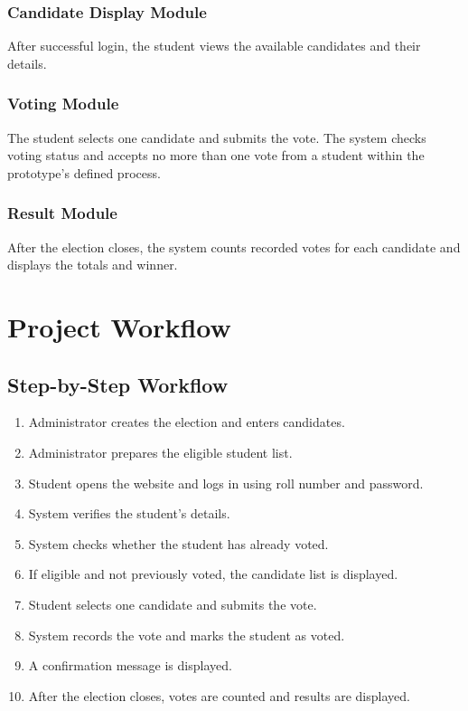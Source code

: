 \documentclass[12pt,a4paper]{report}
\begin{document}
\subsection{Candidate Display Module}
After successful login, the student views the available candidates and their details.
\subsection{Voting Module}
The student selects one candidate and submits the vote. The system checks voting status and accepts no more than one vote from a student within the prototype's defined process.
\subsection{Result Module}
After the election closes, the system counts recorded votes for each candidate and displays the totals and winner.

\chapter{Project Workflow}
\section{Step-by-Step Workflow}
\begin{enumerate}
\item Administrator creates the election and enters candidates.
\item Administrator prepares the eligible student list.
\item Student opens the website and logs in using roll number and password.
\item System verifies the student's details.
\item System checks whether the student has already voted.
\item If eligible and not previously voted, the candidate list is displayed.
\item Student selects one candidate and submits the vote.
\item System records the vote and marks the student as voted.
\item A confirmation message is displayed.
\item After the election closes, votes are counted and results are displayed.
\end{enumerate}
\end{document}
